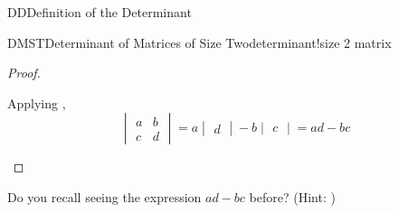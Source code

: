 \begin{subsect}{DD}{Definition of the Determinant}
\begin{theorem}{DMST}{Determinant of Matrices of Size Two}{determinant!size 2 matrix}
\end{theorem}
%
\begin{proof}
\begin{para}Applying ,
%
\begin{equation*}
\begin{vmatrix}
a&b\\c&d
\end{vmatrix}=
a\begin{vmatrix}d\end{vmatrix}-b\begin{vmatrix}c\end{vmatrix}=ad-bc
\end{equation*}
\end{para}
%
\end{proof}
%
\begin{para}Do you recall seeing the expression $ad-bc$ before?  (Hint:  )\end{para}
%
\end{subsect}
%
